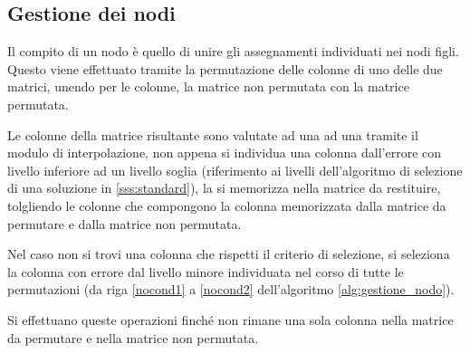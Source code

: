 \documentclass[a4paper,12pt]{report}
\begin{document}
  \subsection{Gestione dei nodi}
  \label{ss:non_foglia}
  Il compito di un nodo è quello di unire gli assegnamenti individuati nei nodi figli. Questo viene effettuato tramite la permutazione delle colonne di uno delle due matrici, unendo per le colonne, la matrice non permutata con la matrice permutata.

  Le colonne della matrice risultante sono valutate ad una ad una tramite il modulo di interpolazione, non appena si individua una colonna dall'errore con livello inferiore ad un livello soglia (riferimento ai livelli dell'algoritmo di selezione di una soluzione in \ref{sss:standard}), la si memorizza nella matrice da restituire, tolgliendo le colonne che compongono la colonna memorizzata dalla matrice da permutare e dalla matrice non permutata.

  Nel caso non si trovi una colonna che rispetti il criterio di selezione, si seleziona la colonna con errore dal livello minore individuata nel corso di tutte le permutazioni (da riga \ref{nocond1} a \ref{nocond2} dell'algoritmo \ref{alg:gestione_nodo}).

  Si effettuano queste operazioni finché non rimane una sola colonna nella matrice da permutare e nella matrice non permutata.
\end{document}
